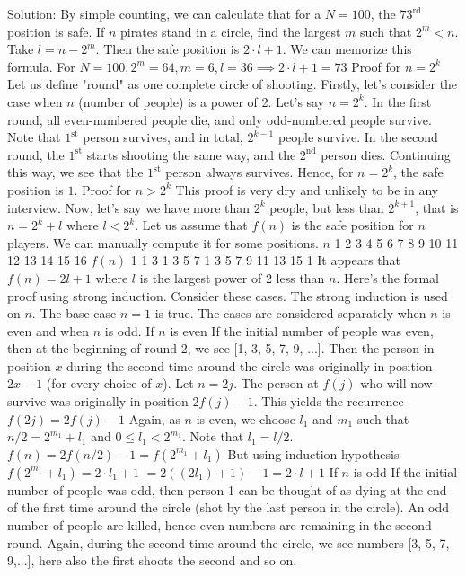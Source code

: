 \begin{enumerate}
Solution: By simple counting, we can calculate that for a $N=100$, the $73^{\text{rd}}$ position is safe.
If $n$ pirates stand in a circle, find the largest $m$ such that $2^m < n$.
Take $l = n-2^m$.
Then the safe position is $2 \cdot l + 1$.
We can memorize this formula.
For $N=100, 2^m=64, m=6, l = 36 \implies 2 \cdot l + 1 = 73$
Proof for $n=2^k$
Let us define "round" as one complete circle of shooting.
Firstly, let's consider the case when $n$ (number of people) is a power of 2.
Let's say $n = 2^k$.
In the first round, all even-numbered people die, and only odd-numbered people survive. Note that $1^{\text{st}}$ person survives, and in total, $2^{k-1}$ people survive. In the second round, the $1^{\text{st}}$ starts shooting the same way, and the $2^{\text{nd}}$ person dies. Continuing this way, we see that the $1^{\text{st}}$ person always survives.
Hence, for $n = 2^k$, the safe position is $1$.
Proof for $n>2^k$
This proof is very dry and unlikely to be in any interview.
Now, let's say we have more than $2^k$ people, but less than $2^{k+1}$, that is $n = 2^k + l$ where $l < 2^k$.
Let us assume that $f(n)$ is the safe position for $n$ players.
We can manually compute it for some positions.
$n$
1
2
3
4
5
6
7
8
9
10
11
12
13
14
15
16
$f(n)$
1
1
3
1
3
5
7
1
3
5
7
9
11
13
15
1
It appears that $f(n) = 2l + 1$ where $l$ is the largest power of 2 less than $n$.
Here's the formal proof using strong induction. Consider these cases.
The strong induction is used on $n$. The base case $n=1$ is true.
The cases are considered separately when $n$ is even and when $n$ is odd.
If $n$ is even
If the initial number of people was even, then at the beginning of round 2, we see [1, 3, 5, 7, 9, ...].
Then the person in position $x$ during the second time around the circle was originally in position  $2x - 1$ (for every choice of $x$). Let $n=2j$. The person at $f(j)$ who will now survive was originally in position $2f(j) - 1$. This yields the recurrence
$f(2j)=2f(j)-1$
Again, as $n$ is even, we choose $l_1$ and $m_1$ such that $n/2 = 2^{m_1}+l_1$ and $0\leq l_1 < 2^{m_1}$.
Note that $l_1 = l/2$.
$f(n) = 2f(n/2)-1 = f(2^{m_1} + l_1)$
But using induction hypothesis $f(2^{m_1} + l_1) = 2 \cdot l_1  +1$
$= 2((2l_1)+1) - 1=2\cdot l+1$
If $n$ is odd
If the initial number of people was odd, then person 1 can be thought of as dying at the end of the first time around the circle (shot by the last person in the circle). An odd number of people are killed, hence even numbers are remaining in the second round. Again, during the second time around the circle, we see numbers [3, 5, 7, 9,...], here also the first shoots the second and so on.

\end{enumerate}
